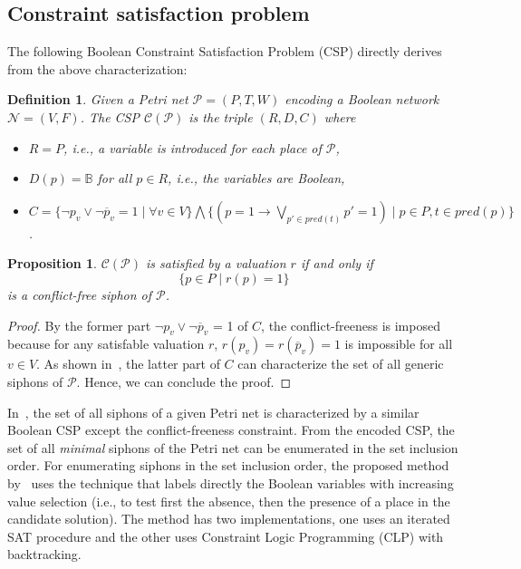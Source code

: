 \documentclass[preprint,12pt]{elsarticle}
\newtheorem{definition}{Definition}[section]
\newtheorem{proposition}{Proposition}[section]
\begin{document}
\subsection{Constraint satisfaction problem}
\label{subsec:computation_csp}

The following Boolean Constraint Satisfaction Problem (CSP) directly derives from the above characterization:
\begin{definition}

  Given a Petri net \(\mathcal{P} = (P, T, W)\) encoding a Boolean network \(\mathcal{N} = (V, F)\).
  The CSP \(\mathcal{C}(\mathcal{P})\) is the triple \((R, D, C)\) where
  \begin{itemize}%
    \item \(R = P\), i.e., a variable is introduced for each place of \(\mathcal{P}\),
    \item \(D(p) = \mathbb{B}\) for all \(p \in R\), i.e., the variables are Boolean,
    \item \(C = \{\neg p_v \vee \neg \overline{p}_v = 1 \mid \forall v \in V\} \bigwedge
\{(p = 1 \rightarrow \bigvee_{p' \in pred(t)}p' = 1) \mid p \in P, t \in pred(p)\}\).
  \end{itemize}

\end{definition}

\begin{proposition}
\label{prop:csp_conflict_free_siphon}
  \(\mathcal{C}(\mathcal{P})\) is satisfied by a valuation \(r\) if and only if
  \[
    \{p \in P \;|\; r(p) = 1\}\
  \]
  is a conflict-free siphon of \(\mathcal{P}\).

\end{proposition}

\begin{proof}

  By the former part \(\neg p_v \vee \neg \overline{p}_v\) = 1 of \(C\), the conflict-freeness is imposed because for any satisfable valuation \(r\), \(r(p_v) = r(\overline{p}_v) = 1\) is impossible for all \(v \in V\).
  As shown in~\cite{nabli2016enumerating}, the latter part of \(C\) can characterize the set of all generic siphons of \(\mathcal{P}\).
  Hence, we can conclude the proof.
  
\end{proof}

In~\cite{nabli2016enumerating}, the set of all siphons of a given Petri net is characterized by a similar Boolean CSP except the conflict-freeness constraint.
From the encoded CSP, the set of all \emph{minimal} siphons of the Petri net can be enumerated in the set inclusion order.
For enumerating siphons in the set inclusion order, the proposed method by~\cite{nabli2016enumerating} uses the technique that labels directly the Boolean variables with increasing value selection (i.e., to test first the absence, then the presence of a place in the candidate solution).
The method has two implementations, one uses an iterated SAT procedure and the other uses Constraint Logic Programming (CLP) with backtracking.
\end{document}
